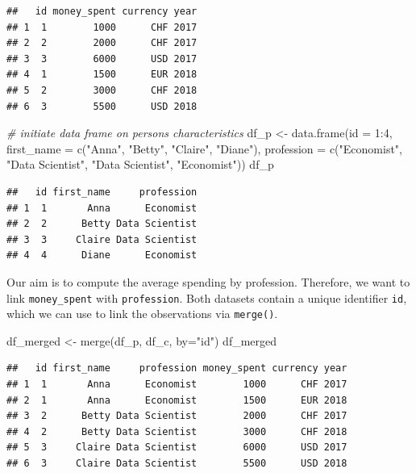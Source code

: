 \documentclass[
  12pt,
]{style/krantz}
\newenvironment{Shaded}{\begin{snugshade}}{\end{snugshade}}
\newcommand{\AttributeTok}[1]{\textcolor[rgb]{0.77,0.63,0.00}{#1}}
\newcommand{\CommentTok}[1]{\textcolor[rgb]{0.56,0.35,0.01}{\textit{#1}}}
\newcommand{\DecValTok}[1]{\textcolor[rgb]{0.00,0.00,0.81}{#1}}
\newcommand{\FunctionTok}[1]{\textcolor[rgb]{0.00,0.00,0.00}{#1}}
\newcommand{\NormalTok}[1]{#1}
\newcommand{\OtherTok}[1]{\textcolor[rgb]{0.56,0.35,0.01}{#1}}
\newcommand{\SpecialCharTok}[1]{\textcolor[rgb]{0.00,0.00,0.00}{#1}}
\newcommand{\StringTok}[1]{\textcolor[rgb]{0.31,0.60,0.02}{#1}}
\begin{document}
\begin{verbatim}
##   id money_spent currency year
## 1  1        1000      CHF 2017
## 2  2        2000      CHF 2017
## 3  3        6000      USD 2017
## 4  1        1500      EUR 2018
## 5  2        3000      CHF 2018
## 6  3        5500      USD 2018
\end{verbatim}

\begin{Shaded}
\begin{Highlighting}[]
\CommentTok{\# initiate data frame on persons\textquotesingle{} characteristics}
\NormalTok{df\_p }\OtherTok{\textless{}{-}} \FunctionTok{data.frame}\NormalTok{(}\AttributeTok{id =} \DecValTok{1}\SpecialCharTok{:}\DecValTok{4}\NormalTok{,}
                   \AttributeTok{first\_name =} \FunctionTok{c}\NormalTok{(}\StringTok{"Anna"}\NormalTok{, }\StringTok{"Betty"}\NormalTok{, }\StringTok{"Claire"}\NormalTok{, }\StringTok{"Diane"}\NormalTok{),}
                   \AttributeTok{profession =} \FunctionTok{c}\NormalTok{(}\StringTok{"Economist"}\NormalTok{, }\StringTok{"Data Scientist"}\NormalTok{,}
                                  \StringTok{"Data Scientist"}\NormalTok{, }\StringTok{"Economist"}\NormalTok{))}
\NormalTok{df\_p}
\end{Highlighting}
\end{Shaded}

\begin{verbatim}
##   id first_name     profession
## 1  1       Anna      Economist
## 2  2      Betty Data Scientist
## 3  3     Claire Data Scientist
## 4  4      Diane      Economist
\end{verbatim}

Our aim is to compute the average spending by profession. Therefore, we want to link \texttt{money\_spent} with \texttt{profession}. Both datasets contain a unique identifier \texttt{id}, which we can use to link the observations via \texttt{merge()}.

\begin{Shaded}
\begin{Highlighting}[]
\NormalTok{df\_merged }\OtherTok{\textless{}{-}} \FunctionTok{merge}\NormalTok{(df\_p, df\_c, }\AttributeTok{by=}\StringTok{"id"}\NormalTok{)}
\NormalTok{df\_merged}
\end{Highlighting}
\end{Shaded}

\begin{verbatim}
##   id first_name     profession money_spent currency year
## 1  1       Anna      Economist        1000      CHF 2017
## 2  1       Anna      Economist        1500      EUR 2018
## 3  2      Betty Data Scientist        2000      CHF 2017
## 4  2      Betty Data Scientist        3000      CHF 2018
## 5  3     Claire Data Scientist        6000      USD 2017
## 6  3     Claire Data Scientist        5500      USD 2018
\end{verbatim}
\end{document}

